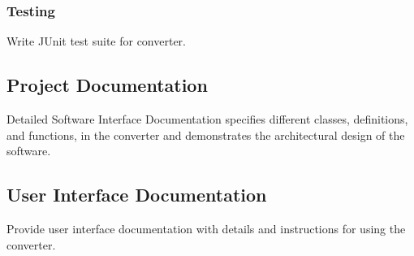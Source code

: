 \documentclass[12pt]{article}
\begin{document}
\subsubsection{Testing}
Write JUnit test suite for converter.

\subsection{Project Documentation}
Detailed Software Interface Documentation specifies different classes, definitions, and functions, in the converter and demonstrates the architectural design of the software.

\subsection{User Interface Documentation}
Provide user interface documentation with details and instructions for using the converter.
\end{document}
